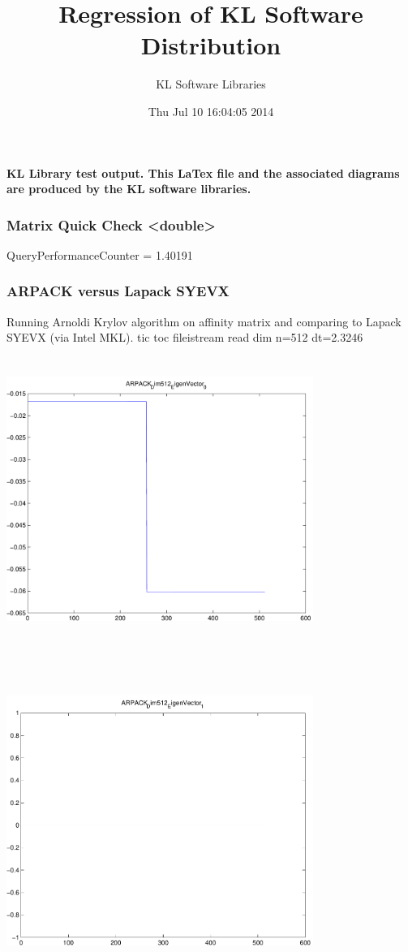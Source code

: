 \documentclass[9pt]{article}
\theoremstyle{plain}
\theoremstyle{definition}
\theoremstyle{remark}
\numberwithin{equation}{section}
\begin{document}
\title{Regression of KL Software Distribution   }
\author{KL Software Libraries}
\date{Thu Jul 10 16:04:05 2014
}
\maketitle
\textbf{ KL Library test output.  This LaTex file and the associated diagrams are produced by the KL software libraries.}
\subsubsection{Matrix Quick Check <double>}
QueryPerformanceCounter  =  1.40191
\subsubsection{ARPACK versus Lapack SYEVX}
Running Arnoldi Krylov algorithm on affinity matrix and comparing to Lapack SYEVX (via Intel MKL).
tic toc fileistream read dim n=512 dt=2.3246
\includegraphics[width=10.0cm,height=10.0cm]{ARPACK_Dim512_EigenVector_0.pdf}

\includegraphics[width=10.0cm,height=10.0cm]{ARPACK_Dim512_EigenVector_1.pdf}
\end{document}
